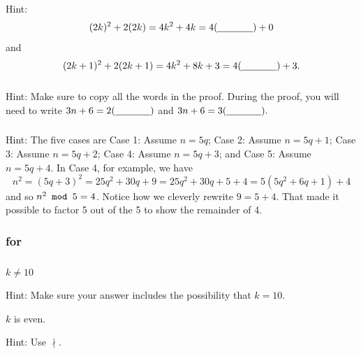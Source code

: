 \subsubsection*{ \answers}
    Hint: $$(2k)^2+2(2k) = 4k^2+4k = 4(\underline{\hspace{.5in}}) + 0$$ and $$(2k+1)^2 + 2(2k+1) = 4k^2 + 8k + 3= 4(\underline{\hspace{.5in}}) + 3.$$

\subsubsection*{ \answers}
    Hint: Make sure to copy all the words in the proof.  During the proof, you will need to write $3n+6 = 2(\underline{\hspace{.5in}})$ and $3n+6 = 3(\underline{\hspace{.5in}}).$

\subsubsection*{ \answers}
    Hint: The five cases are Case 1: Assume $n = 5q$; Case 2: Assume $n=5q+1$; Case 3: Assume $n=5q+2$; Case 4: Assume $n=5q+3$; and Case 5: Assume $n=5q+4$. In Case 4, for example, we have 
        $$n^2=(5q+3)^2=25q^2+30q+9=25q^2+30q+5+4=5(5q^2+6q+1)+4$$ 
    and so $n^2 \texttt{ mod } 5 = 4$.  Notice how we cleverly rewrite $9 = 5+4$.  That made it possible to factor 5 out of the 5 to show the remainder of 4.

\subsubsection{\answers for  
\subequivneg}

\subsubsection*{ \answers}
\begin{apart}
    \item $k \neq 10$
    \item Hint: Make sure your answer includes the possibility that $k=10$.
    \item $k$ is even.
    \item Hint: Use $\nmid$.
\end{apart}

